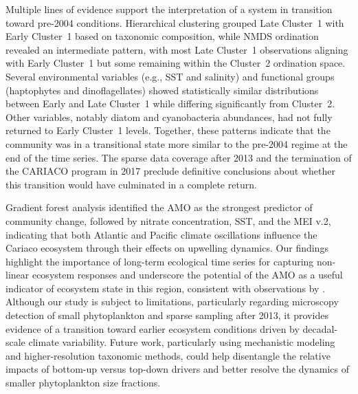 \documentclass[]{agujournal2019}
\begin{document}
    Multiple lines of evidence support the interpretation of a system in transition toward pre-2004 conditions. Hierarchical clustering grouped Late Cluster~1 with Early Cluster~1 based on taxonomic composition, while NMDS ordination revealed an intermediate pattern, with most Late Cluster~1 observations aligning with Early Cluster~1 but some remaining within the Cluster~2 ordination space. Several environmental variables (e.g., SST and salinity) and functional groups (haptophytes and dinoflagellates) showed statistically similar distributions between Early and Late Cluster~1 while differing significantly from Cluster~2. Other variables, notably diatom and cyanobacteria abundances, had not fully returned to Early Cluster~1 levels. Together, these patterns indicate that the community was in a transitional state more similar to the pre-2004 regime at the end of the time series. The sparse data coverage after 2013 and the termination of the CARIACO program in 2017 preclude definitive conclusions about whether this transition would have culminated in a complete return.
    
    Gradient forest analysis identified the AMO as the strongest predictor of community change, followed by nitrate concentration, SST, and the MEI v.2, indicating that both Atlantic and Pacific climate oscillations influence the Cariaco ecosystem through their effects on upwelling dynamics. Our findings highlight the importance of long-term ecological time series for capturing non-linear ecosystem responses and underscore the potential of the AMO as a useful indicator of ecosystem state in this region, consistent with observations by . Although our study is subject to limitations, particularly regarding microscopy detection of small phytoplankton and sparse sampling after 2013, it provides evidence of a transition toward earlier ecosystem conditions driven by decadal-scale climate variability. Future work, particularly using mechanistic modeling and higher-resolution taxonomic methods, could help disentangle the relative impacts of bottom-up versus top-down drivers and better resolve the dynamics of smaller phytoplankton size fractions.



\end{document}
